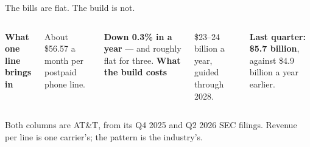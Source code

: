 \begin{frame}{The bills are flat. The build is not.}
  \begin{columns}[T,onlytextwidth]
      \large\textbf{What one line brings in}

      \vspace{0.6em}
      \small
      About \$56.57 a month per postpaid phone line.

      \vspace{0.5em}
      \textbf{Down 0.3\% in a year} --- and roughly flat for three.
      \large\textbf{What the build costs}

      \vspace{0.6em}
      \small
      \$23--24 billion a year, guided through 2028.

      \vspace{0.5em}
      \textbf{Last quarter: \$5.7 billion}, against \$4.9 billion a year earlier.
  \end{columns}

  \vspace{0.7em}
  {\scriptsize\textcolor{softgray}{Both columns are AT\&T, from its Q4 2025 and
   Q2 2026 SEC filings. Revenue per line is one carrier's; the pattern is the
   industry's.}\par}


\end{frame}

